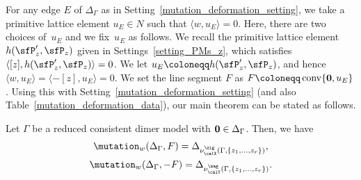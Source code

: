 For any edge $E$ of $\Delta_\Gamma$ as in Setting~\ref{mutation_deformation_setting}, we take a primitive lattice element $u_E\in N$ such that $\langle w,u_E\rangle=0$.
Here, there are two choices of~$u_E$ and we fix~$u_E$ as follows.
We recall the primitive lattice element $h(\sfP^\prime_z,\sfP_z)$ given in Settings~\ref{setting_PMs_z}, which satisfies $\langle[z],h(\sfP^\prime_z,\sfP_z)\rangle=0$.
We let $u_E\coloneqq h(\sfP^\prime_z,\sfP_z)$, and hence $\langle w,u_E\rangle=\langle-[z],u_E\rangle=0$.
We set the line segment $F$ as $F\coloneqq \operatorname{conv}\{{\bf 0},u_E\}$.
Using this with Setting~\ref{mutation_deformation_setting} (and also Table~\ref{mutation_deformation_data}),
our main theorem can be stated as follows.

\begin{Theorem}\label{mutation=deformation}
Let $\Gamma$ be a reduced consistent dimer model with ${\bf 0}\in\Delta_\Gamma$.
Then, we have
\begin{gather*}
\mutation_{w}(\Delta_\Gamma,F)=\Delta_{\nu^\zig_\calX(\Gamma,\{z_1,\dots,z_r\})},\\
\mutation_{w}(\Delta_\Gamma,-F)=\Delta_{\nu^\zag_\calY(\Gamma,\{z_1,\dots,z_r\})}.
\end{gather*}
\end{Theorem}

